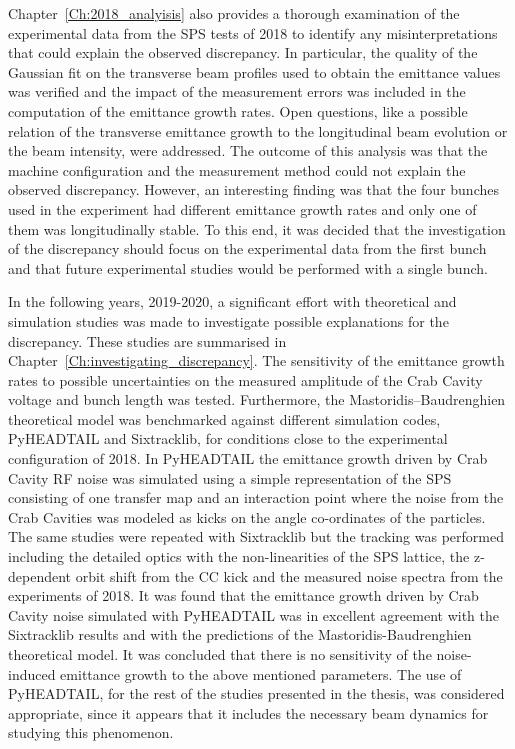 Chapter~\ref{Ch:2018_analyisis} also provides a thorough examination of the experimental data from the SPS tests of 2018 to identify any misinterpretations that could explain the observed discrepancy. In particular, the quality of the  Gaussian fit on the transverse beam profiles used to obtain the emittance values was verified and the impact of the measurement errors was included in the computation of the emittance growth rates. Open questions, like a possible relation of the transverse emittance growth to the longitudinal beam evolution or the beam intensity, were addressed. The outcome of this analysis was that the machine configuration and the measurement method could not explain the observed discrepancy. However, an interesting finding was that the four bunches used in the experiment had different emittance growth rates and only one of them was longitudinally stable. To this end, it was decided that the investigation of the discrepancy should focus on the experimental data from the first bunch and that future experimental studies would be performed with a single bunch.


In the following years, 2019-2020, a significant effort with theoretical and simulation studies was made to investigate possible explanations for the discrepancy. These studies are summarised in Chapter~\ref{Ch:investigating_discrepancy}. The sensitivity of the emittance growth rates to possible uncertainties on the measured amplitude of the Crab Cavity voltage and bunch length was tested. Furthermore, the Mastoridis--Baudrenghien theoretical model was benchmarked against different simulation codes, PyHEADTAIL and Sixtracklib, for conditions close to the experimental configuration of 2018. In PyHEADTAIL the emittance growth driven by Crab Cavity RF noise was simulated using a simple representation of the SPS consisting of one transfer map and an interaction point where the noise from the Crab Cavities was modeled as kicks on the angle co-ordinates of the particles. The same studies were repeated with Sixtracklib but the tracking was performed including the detailed optics with the non-linearities of the SPS lattice, the z-dependent orbit shift from the CC kick and the measured noise spectra from the experiments of 2018. It was found that the emittance growth driven by Crab Cavity noise simulated with PyHEADTAIL was in excellent agreement with the Sixtracklib results and with the predictions of the Mastoridis-Baudrenghien theoretical model. It was concluded that there is no sensitivity of the noise-induced emittance growth to the above mentioned parameters.  The use of PyHEADTAIL, for the rest of the studies presented in the thesis, was considered appropriate, since it appears that it includes the necessary beam dynamics for studying this phenomenon.

